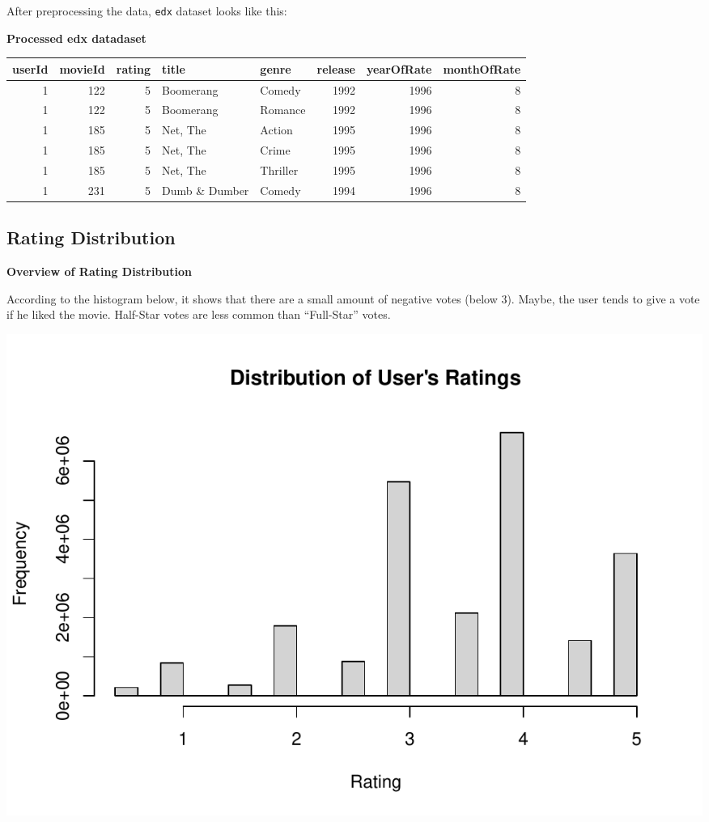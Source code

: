 \documentclass[
]{article}
\begin{document}
After preprocessing the data, \texttt{edx} dataset looks like this:

\textbf{Processed edx datadaset}

\begin{table}
\centering\begingroup\fontsize{10}{12}\selectfont

\begin{tabular}{r|r|r|l|l|r|r|r}
\hline
userId & movieId & rating & title & genre & release & yearOfRate & monthOfRate\\
\hline
1 & 122 & 5 & Boomerang & Comedy & 1992 & 1996 & 8\\
\hline
1 & 122 & 5 & Boomerang & Romance & 1992 & 1996 & 8\\
\hline
1 & 185 & 5 & Net, The & Action & 1995 & 1996 & 8\\
\hline
1 & 185 & 5 & Net, The & Crime & 1995 & 1996 & 8\\
\hline
1 & 185 & 5 & Net, The & Thriller & 1995 & 1996 & 8\\
\hline
1 & 231 & 5 & Dumb \& Dumber & Comedy & 1994 & 1996 & 8\\
\hline
\end{tabular}
\endgroup{}
\end{table}

\newpage

\hypertarget{rating-distribution}{%
\subsection{Rating Distribution}\label{rating-distribution}}

\textbf{Overview of Rating Distribution}

According to the histogram below, it shows that there are a small amount
of negative votes (below 3). Maybe, the user tends to give a vote if he
liked the movie. Half-Star votes are less common than ``Full-Star''
votes.

\begin{center}\includegraphics{MovieLens-Project-Report_files/figure-latex/unnamed-chunk-17-1} \end{center}
\end{document}
